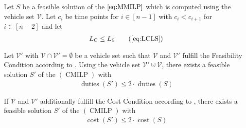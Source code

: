 \begin{theorem}
\label{thm:doubleduties}

Let $S$ be a feasible solution of the $\eqref{eq:MMILP}$ which is computed using the vehicle set $\mathcal{V}$. Let $c_i$ be time points for $i\in[n-1]$ with ${c_i<c_{i+1}}$ for ${i\in[n-2]}$ and let
\begin{align}
	L_{\operatorname{C}} \leq L_{\operatorname{S}} \tag{\ref{eq:LCLS}}
\end{align}

Let $\mathcal{V}'$ with ${\mathcal{V}\cap\mathcal{V}'=\emptyset}$ be a vehicle set such that $\mathcal{V}$ and $\mathcal{V}'$ fulfill the Feasibility Condition according to . Using the vehicle set $\mathcal{V}'\cupdot\mathcal{V}$, there exists a feasible solution $S'$ of the $(\operatorname{CMILP})$ with
\begin{align}
	\operatorname{duties}\left(S'\right) \leq 2\cdot\operatorname{duties}\left(S\right)
\end{align}

If $\mathcal{V}$ and $\mathcal{V}'$ additionally fulfill the Cost Condition according to , there exists a feasible solution $S'$ of the $(\operatorname{CMILP})$ with
\begin{align}
	\operatorname{cost}\left(S'\right) \leq 2\cdot\operatorname{cost}\left(S\right)
\end{align}

\end{theorem}

